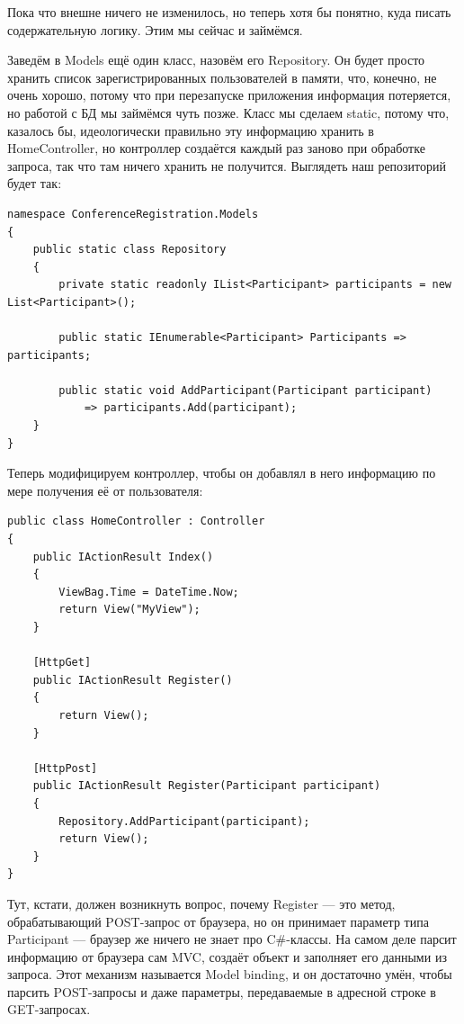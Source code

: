 \documentclass[a5paper]{article}
\begin{document}
Пока что внешне ничего не изменилось, но теперь хотя бы понятно, куда писать содержательную логику. Этим мы сейчас и займёмся. 

Заведём в Models ещё один класс, назовём его Repository. Он будет просто хранить список зарегистрированных пользователей в памяти, что, конечно, не очень хорошо, потому что при перезапуске приложения информация потеряется, но работой с БД мы займёмся чуть позже.
Класс мы сделаем static, потому что, казалось бы, идеологически правильно эту информацию хранить в HomeController, но контроллер создаётся каждый раз заново при обработке запроса, так что там ничего хранить не получится.
Выглядеть наш репозиторий будет так:

\begin{verbatim}
namespace ConferenceRegistration.Models
{
    public static class Repository
    {
        private static readonly IList<Participant> participants = new List<Participant>();

        public static IEnumerable<Participant> Participants => participants;

        public static void AddParticipant(Participant participant) 
            => participants.Add(participant);
    }
}
\end{verbatim}

Теперь модифицируем контроллер, чтобы он добавлял в него информацию по мере получения её от пользователя:

\begin{verbatim}
public class HomeController : Controller
{
    public IActionResult Index()
    {
        ViewBag.Time = DateTime.Now;
        return View("MyView");
    }

    [HttpGet]
    public IActionResult Register()
    {
        return View();
    }

    [HttpPost]
    public IActionResult Register(Participant participant)
    {
        Repository.AddParticipant(participant);
        return View();
    }
}
\end{verbatim}

Тут, кстати, должен возникнуть вопрос, почему Register --- это метод, обрабатывающий POST-запрос от браузера, но он принимает параметр типа Participant --- браузер же ничего не знает про C\#-классы. На самом деле парсит информацию от браузера сам MVC, создаёт объект и заполняет его данными
из запроса. Этот механизм называется Model binding, и он достаточно умён, чтобы парсить POST-запросы и даже параметры, передаваемые в адресной строке в GET-запросах.
\end{document}

